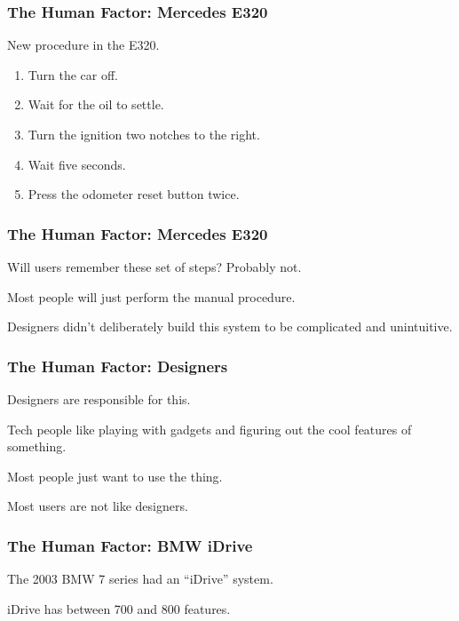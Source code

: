 \begin{frame}
\frametitle{The Human Factor: Mercedes E320}
\begin{changemargin}{1cm}
New procedure in the E320.
\begin{enumerate}
	\item Turn the car off.
	\item Wait for the oil to settle.
	\item Turn the ignition two notches to the right.
	\item Wait five seconds.
	\item Press the odometer reset button twice.
\end{enumerate}
\end{changemargin}
\end{frame}

\begin{frame}
\frametitle{The Human Factor: Mercedes E320}
\begin{changemargin}{1cm}
Will users remember these set of steps? Probably not. 

Most people will just perform the manual procedure. 

Designers didn't deliberately build this system to be complicated and unintuitive.

\end{changemargin}
\end{frame}

\begin{frame}
\frametitle{The Human Factor: Designers}
\begin{changemargin}{1cm}
Designers are responsible for this.

Tech people like playing with gadgets and figuring out the cool features of something.

Most people just want to use the thing.

Most users are not like designers.

\end{changemargin}
\end{frame}

\begin{frame}
\frametitle{The Human Factor: BMW iDrive}
\begin{changemargin}{1cm}
The 2003 BMW 7 series had an ``iDrive'' system.

iDrive has between 700 and 800 features.

\end{changemargin}
\end{frame}


